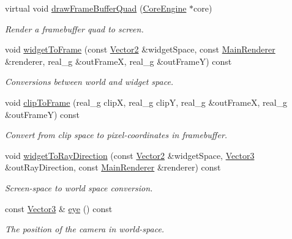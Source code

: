 \begin{Indent}
\begin{DoxyCompactItemize}
virtual void \mbox{\hyperlink{classrev_1_1_camera_a65f7b476c8d304ceed5ea5b5cd240dd7}{draw\+Frame\+Buffer\+Quad}} (\mbox{\hyperlink{classrev_1_1_core_engine}{Core\+Engine}} $\ast$core)
\begin{DoxyCompactList}\small\item\em Render a framebuffer quad to screen. \end{DoxyCompactList}\item 
void \mbox{\hyperlink{classrev_1_1_camera_a8d45a221dc8e228d52e6787b3f6e99eb}{widget\+To\+Frame}} (const \mbox{\hyperlink{classrev_1_1_vector}{Vector2}} \&widget\+Space, const \mbox{\hyperlink{classrev_1_1_main_renderer}{Main\+Renderer}} \&renderer, real\+\_\+g \&out\+FrameX, real\+\_\+g \&out\+FrameY) const
\begin{DoxyCompactList}\small\item\em Conversions between world and widget space. \end{DoxyCompactList}\item 
\mbox{\label{classrev_1_1_camera_a2f3dad5600924021016980d3bee27050}} 
void \mbox{\hyperlink{classrev_1_1_camera_a2f3dad5600924021016980d3bee27050}{clip\+To\+Frame}} (real\+\_\+g clipX, real\+\_\+g clipY, real\+\_\+g \&out\+FrameX, real\+\_\+g \&out\+FrameY) const
\begin{DoxyCompactList}\small\item\em Convert from clip space to pixel-\/coordinates in framebuffer. \end{DoxyCompactList}\item 
void \mbox{\hyperlink{classrev_1_1_camera_a202e8948c33bbba3a1d63d26f06a7b4b}{widget\+To\+Ray\+Direction}} (const \mbox{\hyperlink{classrev_1_1_vector}{Vector2}} \&widget\+Space, \mbox{\hyperlink{classrev_1_1_vector}{Vector3}} \&out\+Ray\+Direction, const \mbox{\hyperlink{classrev_1_1_main_renderer}{Main\+Renderer}} \&renderer) const
\begin{DoxyCompactList}\small\item\em Screen-\/space to world space conversion. \end{DoxyCompactList}\item 
\mbox{\label{classrev_1_1_camera_af3be583f0c817c5251bae6c5617b41f8}} 
const \mbox{\hyperlink{classrev_1_1_vector}{Vector3}} \& \mbox{\hyperlink{classrev_1_1_camera_af3be583f0c817c5251bae6c5617b41f8}{eye}} () const
\begin{DoxyCompactList}\small\item\em The position of the camera in world-\/space. \end{DoxyCompactList}\item 

\end{DoxyCompactItemize}
\end{Indent}
